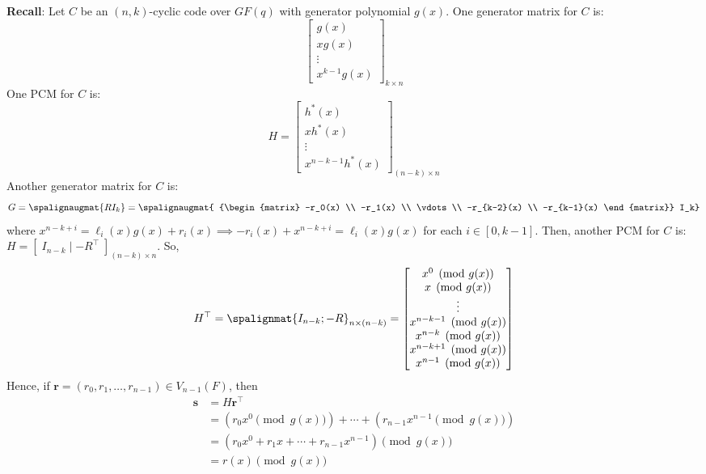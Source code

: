 \textbf{Recall}: Let $ C $ be an $ (n,k) $-cyclic code over $ GF(q) $ with generator
polynomial $ g(x) $. One generator matrix for $ C $ is:
\[
    \begin{bmatrix}
        g(x)   \\
        x g(x) \\
        \vdots \\
        x^{k-1}g(x)
    \end{bmatrix}_{k\times n} \]
One PCM for $ C $ is:
\[ H=
    \begin{bmatrix}
        h^*(x)   \\
        x h^*(x) \\
        \vdots   \\
        x^{n-k-1}h^*(x)
    \end{bmatrix}_{(n-k)\times n} \]
Another generator matrix for $ C $ is:
\[ G=\spalignaugmat{R I_k}=
    \spalignaugmat{
        {\begin{matrix}
                    -r_0(x)     \\
                    -r_1(x)     \\
                    \vdots      \\
                    -r_{k-2}(x) \\
                    -r_{k-1}(x)
                \end{matrix}}
        I_k}
\]
where $ x^{n-k+i}=\ell_i(x)g(x)+r_i(x)\implies -r_i(x)+x^{n-k+i}=\ell_i(x)g(x) $ for each $ i\in[0,k-1] $.
Then, another PCM for $ C $ is: $ H=\left[ \; I_{n-k}\mid -R^\top \; \right]_{(n-k)\times n} $. So,
\[ H^\top=
    \spalignmat{I_{n-k}; -R}_{n\times (n-k)}
    =
    \begin{bmatrix}
        x^0\pmod{g(x)}       \\
        x \pmod{g(x)}        \\
        \vdots               \\
        x^{n-k-1}\pmod{g(x)} \\
        x^{n-k}\pmod{g(x)}   \\
        x^{n-k+1}\pmod{g(x)} \\
        x^{n-1}\pmod{g(x)}
    \end{bmatrix} \]
Hence, if $ \bm{r}=(r_0,r_1,\ldots ,r_{n-1})\in V_{n-1}(F) $, then
\begin{align*}
    \bm{s}
     & =H\bm{r}^\top                                            \\
     & =(r_0 x^0\pmod{g(x)})+\cdots+(r_{n-1}x^{n-1}\pmod{g(x)}) \\
     & =(r_0x^0+r_1x+\cdots+r_{n-1}x^{n-1})\pmod{g(x)}          \\
     & =r(x)\pmod{g(x)}
\end{align*}

